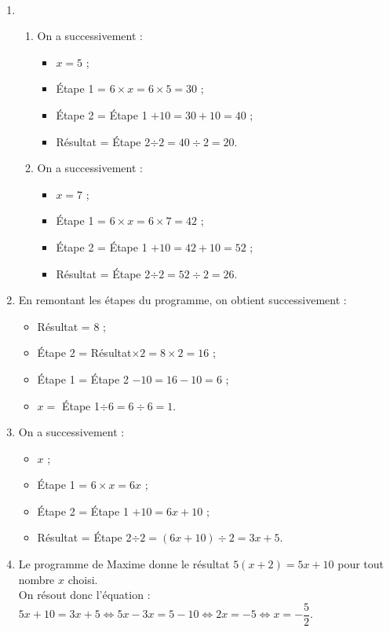 \ \\ [-5mm]
\begin{enumerate}
   \item
   \begin{enumerate}
      \item On a successivement : \\
      \begin{itemize}
         \item $x =5$ ;
         \item Étape 1 = $6\times x =6\times5 =30$ ;
         \item Étape 2 = Étape 1 $+10 =30+10 =40$ ;
         \item Résultat = Étape 2$\div2 =40\div2 =20$.
      \end{itemize}
      \item On a successivement : \\
      \begin{itemize}
         \item $x =7$ ;
         \item Étape 1 = $6\times x =6\times7 =42$ ;
         \item Étape 2 = Étape 1 $+10 =42+10 =52$ ;
         \item Résultat = Étape 2$\div2 =52\div2 =26$.
      \end{itemize}
   \end{enumerate}
   \item En remontant les étapes du programme, on obtient successivement :
   \begin{itemize}
      \item Résultat = 8 ;
      \item Étape 2 = Résultat$\times2 =8\times2 =16$ ;
      \item Étape 1 = Étape 2 $-10 =16-10 =6$ ;
      \item $x =$ Étape 1$\div6 =6\div6 =1$.
   \end{itemize}
   \item On a successivement : \\
   \begin{itemize}
      \item $x$ ;
      \item Étape 1 = $6\times x =6x$ ;
      \item Étape 2 = Étape 1 $+10 =6x+10$ ;
      \item Résultat = Étape 2$\div2 =(6x+10)\div2 =3x+5$.
   \end{itemize}
   \item Le programme de Maxime donne le résultat $5(x+2) =5x+10$ pour tout nombre $x$ choisi. \\
   On résout donc l'équation : $5x+10 =3x+5 \iff 5x-3x =5-10 \iff 2x =-5 \iff x =-\dfrac52$. \\
\end{enumerate}
